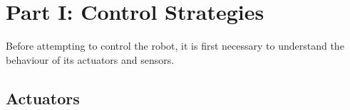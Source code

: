 \documentclass[hidelinks,a4paper,11pt]{article}
\begin{document}
	
	
	
	
	
	\newpage
	
	\section{Part I: Control Strategies}
	
	Before attempting to control the robot, it is first necessary to understand the behaviour of its actuators and sensors.
	
	
	\subsection{Actuators}
	
\end{document}
